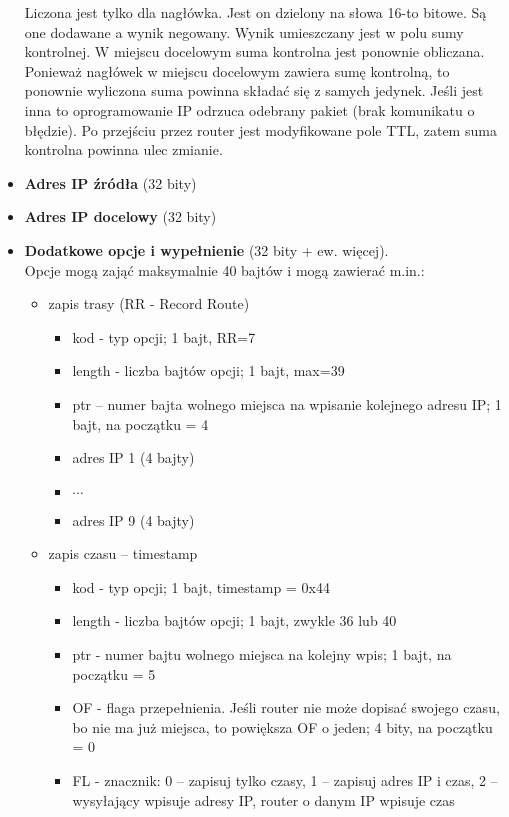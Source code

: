 \documentclass[../main.tex]{subfiles}
\begin{document}
\begin{itemize}
        Liczona jest tylko dla nagłówka. Jest on dzielony na słowa 16-to bitowe. Są one dodawane a wynik negowany. Wynik umieszczany jest w polu sumy kontrolnej. W miejscu docelowym suma kontrolna jest ponownie obliczana. Ponieważ nagłówek w miejscu docelowym zawiera sumę kontrolną, to ponownie wyliczona suma powinna składać się z samych jedynek. Jeśli jest inna to oprogramowanie IP odrzuca odebrany pakiet (brak komunikatu o błędzie). Po przejściu przez router jest modyfikowane pole TTL, zatem suma kontrolna powinna ulec zmianie.
        \item \textbf{Adres IP źródła} (32 bity)
        \item \textbf{Adres IP docelowy} (32 bity)
        \item \textbf{Dodatkowe opcje i wypełnienie} (32 bity + ew. więcej).\\
        Opcje mogą zająć maksymalnie 40 bajtów i mogą zawierać m.in.:
        \begin{itemize}
            \item zapis trasy (RR - Record Route)\\
            \begin{itemize}
                \item kod - typ opcji; 1 bajt, RR=7
                \item length - liczba bajtów opcji; 1 bajt, max=39
                \item ptr – numer bajta wolnego miejsca na wpisanie kolejnego adresu IP; 1 bajt, na początku = 4
                \item adres IP 1 (4 bajty)
                \item $\cdots$
                \item adres IP 9 (4 bajty)
            \end{itemize}
            \item zapis czasu – timestamp
            \begin{itemize}
                \item kod - typ opcji; 1 bajt,  timestamp = 0x44
                \item  length - liczba bajtów opcji; 1 bajt, zwykle 36 lub 40
                \item ptr - numer bajtu wolnego miejsca na kolejny wpis; 1 bajt, na początku = 5
                \item OF - flaga przepełnienia. Jeśli router nie może dopisać swojego czasu, bo nie ma już miejsca, to powiększa OF o jeden; 4 bity, na początku = 0
                \item FL - znacznik: 0 – zapisuj tylko czasy, 1 – zapisuj adres IP i czas, 2 – wysyłający wpisuje adresy IP, router o danym IP wpisuje czas

\end{itemize}
\end{itemize}
\end{itemize}
\end{document}
